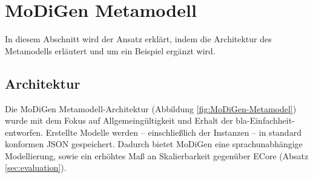 \section{MoDiGen Metamodell}
In diesem Abschnitt wird der Ansatz erkl\"art, indem die Architektur des Metamodells erl\"autert und um ein Beispiel erg\"anzt wird.

\subsection{Architektur}
Die MoDiGen Metamodell-Architektur (Abbildung \ref{fig:MoDiGen-Metamodel}) wurde mit dem Fokus auf Allgemeingültigkeit und Erhalt der bla-Einfachheit- entworfen. Erstellte Modelle werden -- einschließlich der Instanzen -- in standard konformen JSON gespeichert. Dadurch bietet MoDiGen eine sprachunabhängige Modellierung, sowie ein erhöhtes Maß an Skalierbarkeit gegenüber ECore (Absatz \ref{sec:evaluation}).



